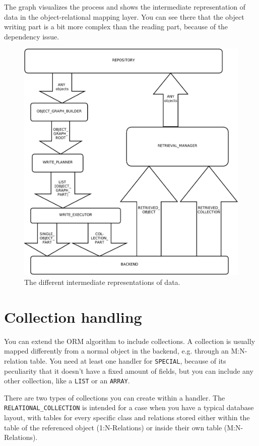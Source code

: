 \documentclass[a4paper,12pt]{report}
\begin{document}
The graph visualizes the process and shows the intermediate representation of data in the object-relational mapping layer.
You can see there that the object writing part is a bit more complex than the reading part, because of the dependency issue.


\begin{figure} [h!]
\centering
\includegraphics[trim= 0mm -10mm 0mm -10mm,clip, width = 13cm] {../includes/dataflow.png}
\caption{The different intermediate representations of data.}
\label{fig:intermediate_data_orm}
\end{figure}



\section{Collection handling}

You can extend the ORM algorithm to include collections. A collection is usually mapped differently from a normal object in the backend, e.g. through an M:N-relation table.
You need at least one handler for \lstinline!SPECIAL!, because of its peculiarity that it doesn't have a fixed amount of fields, but you can include any other collection, like a \lstinline!LIST! or an \lstinline!ARRAY!.

There are two types of collections you can create within a handler. 
The \lstinline!RELATIONAL_COLLECTION! is intended for a case when you have a typical database layout, 
with tables for every specific class and relations stored either within the table of the referenced object (1:N-Relations) or inside their own table (M:N-Relations).
\end{document}
